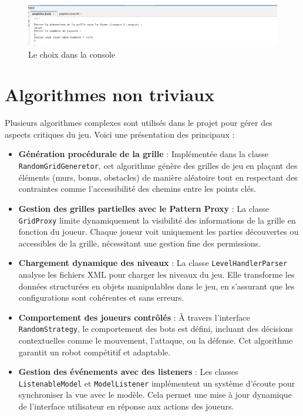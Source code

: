 \documentclass[12pt]{article}
\begin{document}
\begin{figure}[!h]
\centering
\includegraphics[scale=0.25]{images/choix.png}
\caption{Le choix dans la console}
\end{figure}

\section{Algorithmes non triviaux}

Plusieurs algorithmes complexes sont utilisés dans le projet pour gérer des aspects critiques du jeu. Voici une présentation des principaux :

\begin{itemize}
    \item \textbf{Génération procédurale de la grille} :  
    Implémentée dans la classe \texttt{RandomGridGeneretor}, cet algorithme génère des grilles de jeu en plaçant des éléments (murs, bonus, obstacles) de manière aléatoire tout en respectant des contraintes comme l'accessibilité des chemins entre les points clés.

    \item \textbf{Gestion des grilles partielles avec le Pattern Proxy} :  
    La classe \texttt{GridProxy} limite dynamiquement la visibilité des informations de la grille en fonction du joueur. Chaque joueur voit uniquement les parties découvertes ou accessibles de la grille, nécessitant une gestion fine des permissions.

    \item \textbf{Chargement dynamique des niveaux} :  
    La classe \texttt{LevelHandlerParser} analyse les fichiers XML pour charger les niveaux du jeu. Elle transforme les données structurées en objets manipulables dans le jeu, en s'assurant que les configurations sont cohérentes et sans erreurs.

    \item \textbf{Comportement des joueurs contrôlés} :  
    À travers l'interface \texttt{RandomStrategy}, le comportement des bots est défini, incluant des décisions contextuelles comme le mouvement, l'attaque, ou la défense. Cet algorithme garantit un robot compétitif et adaptable.

    \item \textbf{Gestion des événements avec des listeners} :  
    Les classes \texttt{ListenableModel} et \texttt{ModelListener} implémentent un système d'écoute pour synchroniser la vue avec le modèle. Cela permet une mise à jour dynamique de l'interface utilisateur en réponse aux actions des joueurs.
\end{itemize}
\end{document}
